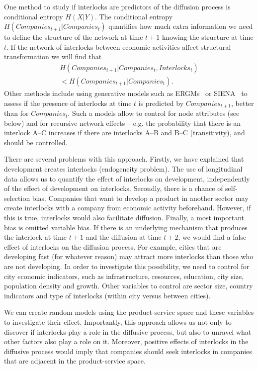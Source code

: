 One method to study if interlocks are predictors of the diffusion process is conditional entropy $H(X|Y)$.
The conditional entropy  $H(Companies_{t+1}|Companies_{t})$ quantifies how much extra information we need to define the structure of the network at time $t+1$ knowing the structure at time $t$. 
If the network of interlocks between economic activities affect structural transformation we will find that 
\begin{equation}
\begin{split}
H(Companies_{t+1}|Companies_{t},Interlocks_{t}) \\
< H(Companies_{t+1}|Companies_{t}).
\end{split}
\end{equation}
Other methods include using generative models such as ERGMs~\citep{robins2007introduction} or SIENA~\citep{snijders2008introduction} to assess if the presence of interlocks at time $t$ is predicted by $Companies_{t+1}$,
better than for $Companies_{t}$.
Such a models allow to control for node attributes (see below) and for recursive network effects 
-- e.g. the probability that there is an interlock A--C increases if there are interlocks A--B and B--C (transitivity), and should be controlled.

There are several problems with this approach.
Firstly, we have explained that development creates interlocks (endogeneity problem).
The use of longitudinal data allows us to quantify the effect of interlocks on development,
independently of the effect of development on interlocks.
Secondly, there is a chance of self-selection bias.
Companies that want to develop a product in another sector may create interlocks with a company from economic activity beforehand.
However, if this is true, interlocks would also facilitate diffusion.
Finally, a most important bias is omitted variable bias.
If there is an underlying mechanism that produces the interlock at time $t + 1$ and the diffusion at time $t + 2$, 
we would find a false effect of interlocks on the diffusion process.
For example, cities that are developing fast (for whatever reason) may attract more interlocks than those who are not developing.
In order to investigate this possibility, we need to control for city economic indicators, such as infrastructure, resources, education, city size, population density and growth.
Other variables to control are sector size, country indicators and type of interlocks (within city versus between cities).


We can create random models using the product-service space and these variables to investigate their effect.
Importantly, this approach allows us not only to discover if interlocks play a role in the diffusive process, 
but also to unravel what other factors also play a role on it.
Moreover, positive effects of interlocks in the diffusive process would imply that companies should seek interlocks in companies that are adjacent in the product-service space.


